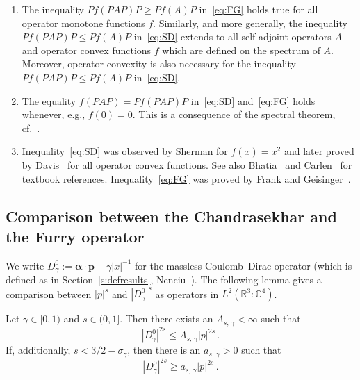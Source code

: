 \documentclass[AHL,Unicode,longabstracts,published]{cedram}
\newcommand*\cz{\mathbb{C}}
\newcommand*\rz{\mathbb{R}}
\newcommand*\balpha{\bm{\alpha}}
\newcommand*\bp{\bm{p}}
\begin{document}
\begin{rema}
\leavevmode
\begin{enumerate}
\item The inequality $Pf(PAP)P \geq Pf(A)P$ in~\eqref{eq:FG} holds true for all operator monotone functions $f$. Similarly, and more generally, the inequality $Pf(PAP)P\leq Pf(A)P$ in~\eqref{eq:SD} extends to all self-adjoint operators $A$ and operator convex functions $f$ which are defined on the spectrum of $A$. Moreover, operator convexity is also necessary for the inequality $Pf(PAP)P\leq Pf(A)P$ in~\eqref{eq:SD}.

\item The equality $f(PAP)=Pf(PAP)P$ in~\eqref{eq:SD} and~\eqref{eq:FG} holds whenever, e.g., $f(0)=0$. This is a consequence of the spectral theorem, cf.~\cite[p.~43]{Davis1957}.

\item Inequality~\eqref{eq:SD} was observed by Sherman for $f(x)=x^2$ and later proved by Davis~\cite{Davis1957} for all operator convex functions. See also Bhatia~\cite[Theorem~V.2.3]{Bhatia1997} and Carlen~\cite[Theorem~4.19]{Carlen2010} for textbook references. Inequality~\eqref{eq:FG} was proved by Frank and Geisinger~\cite[Lemma~6.4]{FrankGeisinger2016}.
\end{enumerate}
\end{rema}



\subsection{Comparison between the Chandrasekhar and the Furry operator}

We write $D^0_\gamma:=\balpha\cdot\bp-\gamma|x|^{-1}$ for the massless Coulomb--Dirac operator (which is defined as in Section~\ref{s:defresults}, Nenciu~\cite{Nenciu1976}). The following lemma gives a comparison between $|p|^s$ and $|D_\gamma^0|^s$ as operators in $L^2(\rz^3:\cz^4)$.


\begin{lemm}\label{hardydom}
Let $\gamma\in[0,1)$ and $s\in(0,1]$. Then there exists an $A_{s,\,\gamma}<\infty$ such that
\[
\left|D^0_\gamma\right|^{2s} \leq A_{s,\,\gamma} |p|^{2s}\,.
\]
If, additionally, $s<3/2-\sigma_{\gamma}$, then there is an $a_{s,\,\gamma}>0$ such that
\[
\left|D^0_\gamma\right|^{2s} \geq a_{s,\,\gamma} |p|^{2s}\,.
\]
\end{lemm}
\end{document}
